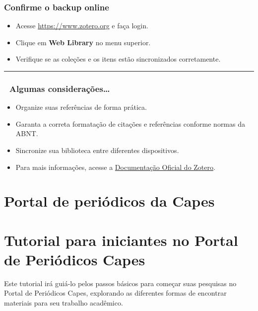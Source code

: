 \documentclass[
  letterpaper,
  DIV=11,
  numbers=noendperiod]{scrreprt}
\providecommand{\tightlist}{%
  \setlength{\itemsep}{0pt}\setlength{\parskip}{0pt}}
\begin{document}
\subsection{Confirme o backup online}\label{confirme-o-backup-online}

\begin{itemize}
\tightlist
\item
  Acesse \url{https://www.zotero.org} e faça login.
\item
  Clique em \textbf{Web Library} no menu superior.
\item
  Verifique se as coleções e os itens estão sincronizados corretamente.
\end{itemize}

\begin{center}\rule{0.5\linewidth}{0.5pt}\end{center}

\subsection{📌 Algumas
considerações\ldots{}}\label{algumas-considerauxe7uxf5es}

\begin{itemize}
\tightlist
\item
  Organize suas referências de forma prática.
\item
  Garanta a correta formatação de citações e referências conforme normas
  da ABNT.
\item
  Sincronize sua biblioteca entre diferentes dispositivos.
\item
  Para mais informações, acesse a
  \href{https://www.zotero.org/support/}{Documentação Oficial do
  Zotero}.
\end{itemize}

\chapter{Portal de periódicos da
Capes}\label{portal-de-periuxf3dicos-da-capes}

\chapter{Tutorial para iniciantes no Portal de Periódicos
Capes}\label{tutorial-para-iniciantes-no-portal-de-periuxf3dicos-capes}

Este tutorial irá guiá-lo pelos passos básicos para começar suas
pesquisas no Portal de Periódicos Capes, explorando as diferentes formas
de encontrar materiais para seu trabalho acadêmico.
\end{document}
